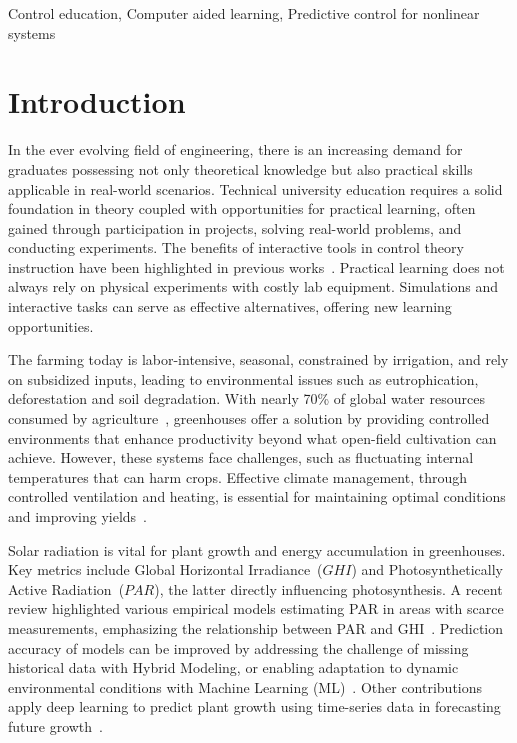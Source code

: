 \documentclass[conference]{IEEEtran}
\newcommand{\citep}{\cite}
\begin{document}
\begin{IEEEkeywords}
    Control education, Computer aided learning, Predictive control for nonlinear systems
\end{IEEEkeywords}

\section{Introduction}

In the ever evolving field of engineering, there is an increasing demand for graduates possessing not only theoretical knowledge but also practical skills applicable in real-world scenarios. Technical university education requires a solid foundation in theory coupled with opportunities for practical learning, often gained through participation in projects, solving real-world problems, and conducting experiments. The benefits of interactive tools in control theory instruction have been highlighted in previous works~\cite{Emami1991, Guzman2013}. Practical learning does not always rely on physical experiments with costly lab equipment. Simulations and interactive tasks can serve as effective alternatives, offering new learning opportunities.

The farming today is labor-intensive, seasonal, constrained by irrigation, and rely on subsidized inputs, leading to environmental issues such as eutrophication, deforestation and soil degradation. With nearly 70\% of global water resources consumed by agriculture~\cite{Debroy2024}, greenhouses offer a solution by providing controlled environments that enhance productivity beyond what open-field cultivation can achieve. However, these systems face challenges, such as fluctuating internal temperatures that can harm crops. Effective climate management, through controlled ventilation and heating, is essential for maintaining optimal conditions and improving yields~\cite{Wu2019}.

Solar radiation is vital for plant growth and energy accumulation in greenhouses. Key metrics include Global Horizontal Irradiance~(\(GHI\)) and Photosynthetically Active Radiation~(\(PAR\)), the latter directly influencing photosynthesis. A recent review highlighted various empirical models estimating PAR in areas with scarce measurements, emphasizing the relationship between PAR and GHI~\citep{NoriegaGardea2021}. Prediction accuracy of models can be improved by addressing the challenge of missing historical data with Hybrid Modeling, or enabling adaptation to dynamic environmental conditions with Machine Learning (ML)~\cite{Iddio2020, MaLu2022}. Other contributions apply deep learning to predict plant growth using time-series data in forecasting future growth~\cite{rs13030331}.
\end{document}
